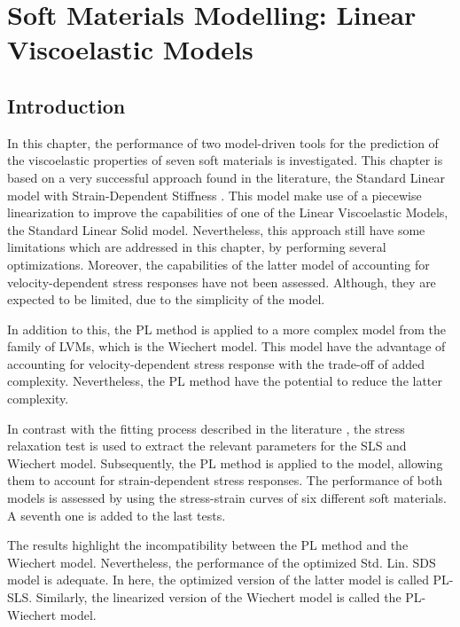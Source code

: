 \chapter{Soft Materials Modelling: Linear Viscoelastic Models} \label{sec:ChapterModellingLVM}


\section{Introduction}

In this chapter, the performance of two model-driven tools for the prediction of the viscoelastic properties of seven soft materials is investigated. This chapter is based on a very successful approach found in the literature, the Standard Linear model with Strain-Dependent Stiffness \cite{austin2015control}. This model make use of a piecewise linearization to improve the capabilities of one of the Linear Viscoelastic Models, the Standard Linear Solid model. Nevertheless, this approach still have some limitations which are addressed in this chapter, by performing several optimizations. Moreover, the capabilities of the latter model of accounting for velocity-dependent stress responses have not been assessed. Although, they are expected to be limited, due to the simplicity of the model.

In addition to this, the PL method is applied to a more complex model from the family of LVMs, which is the Wiechert model. This model have the advantage of accounting for velocity-dependent stress response with the trade-off of added complexity. Nevertheless, the PL method have the potential to reduce the latter complexity.

In contrast with the fitting process described in the literature \cite{austin2015control}, the stress relaxation test is used to extract the relevant parameters for the SLS and Wiechert model. Subsequently, the PL method is applied to the model, allowing them to account for strain-dependent stress responses. The performance of both models is assessed by using the stress-strain curves of six different soft materials. A seventh one is added to the last tests.

The results highlight the incompatibility between the PL method and the Wiechert model. Nevertheless, the performance of the optimized Std. Lin. SDS model is adequate. In here, the optimized version of the latter model is called PL-SLS. Similarly, the linearized version of the Wiechert model is called the PL-Wiechert model.

